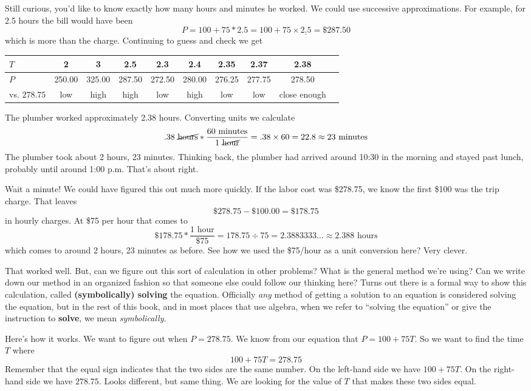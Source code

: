 Still curious, you'd like to know exactly how many hours and minutes he worked.  We could use successive approximations.   
For example, for 2.5 hours the bill would have been 
$$P=100 + 75 \ast 2.5 = 100+75\times \underline{2.5}=\$287.50$$ which is more than the charge. Continuing to guess and check we get
\begin{center}
\begin{tabular} {|l| |c |c |c |c |c |c |c |c |c |} \hline
$T$ & 2 & 3 & 2.5 & 2.3 & 2.4 & 2.35 & 2.37 & 2.38\\ \hline
$P$ & 250.00 & 325.00 & 287.50 & 272.50 & 280.00 & 276.25 &277.75 &278.50 \\ \hline
vs. $278.75$& low & high & high & low & high & low & low & close enough\\ \hline
\end{tabular}
\end{center}

\noindent The plumber worked  approximately 2.38 hours.  
Converting units we calculate $$.38 \text{ \cancel{hours}} \ast  \frac{60 \text{ minutes}}{1 \text{ \cancel{hour}}} = .38 \times 60 = 22.8 \approx 23 \text{ minutes}$$  The plumber took about 2 hours, 23 minutes.  Thinking back, the plumber had arrived around 10:30 in the morning and stayed past lunch, probably until around 1:00 p.m. That's about right.

Wait a minute!  We could have figured this out much more quickly.  If the labor cost was \$278.75, we know the first \$100 was the trip charge.  That leaves $$\$278.75-\$100.00 = \$178.75$$ in hourly charges.  At \$75 per hour that comes to $$\$178.75\ast  \frac{\text{1 hour}}{\$75}=178.75 \div 75 = 2.3883333\ldots \approx 2.388 \text{ hours}$$ which comes to around 2 hours, 23 minutes as before.  See how we used the \$75/hour as a unit conversion here?  Very clever.

That worked well.  But, can we figure out this sort of calculation in other problems?  What is the general method we're using? Can we write down our method in an organized fashion so that someone else could follow our thinking here?  Turns out there is a formal way to show this calculation, called \textbf{(symbolically) solving} the equation. Officially \emph{any} method of getting a solution to an equation is considered solving the equation, but in the rest of this book, and in most places that use algebra, when we refer to ``solving the equation'' or give the instruction to \textbf{solve}, we mean \emph{symbolically}.

Here's how it works.  We want to figure out when $P=278.75$.  We know from our equation that $P = 100 + 75T$.  So we want to find the time $T$ where  $$100 + 75T=278.75$$  Remember that the equal sign indicates that the two sides are the same number.  On the left-hand side we have $100 + 75T$.  On the right-hand side we have $278.75$.  Looks different, but same thing.  We are looking for the value of $T$ that makes these two sides equal.  

